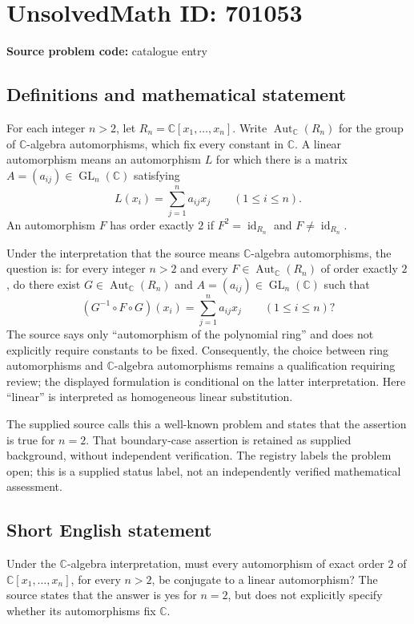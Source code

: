 \documentclass[11pt]{article}
\newcommand{\C}{\mathbb{C}}
\begin{document}
\section*{UnsolvedMath ID: 701053}
\textbf{Source problem code:} catalogue entry
\subsection{Definitions and mathematical statement}
For each integer \(n>2\), let \(R_n=\C[x_1,\ldots,x_n]\). Write \(\operatorname{Aut}_{\C}(R_n)\) for the group of \(\C\)-algebra automorphisms, which fix every constant in \(\C\). A linear automorphism means an automorphism \(L\) for which there is a matrix \(A=(a_{ij})\in\operatorname{GL}_n(\C)\) satisfying
\[
L(x_i)=\sum_{j=1}^{n}a_{ij}x_j\qquad(1\leq i\leq n).
\]
An automorphism \(F\) has order exactly \(2\) if \(F^2=\operatorname{id}_{R_n}\) and \(F\neq\operatorname{id}_{R_n}\).

Under the interpretation that the source means \(\C\)-algebra automorphisms, the question is: for every integer \(n>2\) and every \(F\in\operatorname{Aut}_{\C}(R_n)\) of order exactly \(2\), do there exist \(G\in\operatorname{Aut}_{\C}(R_n)\) and \(A=(a_{ij})\in\operatorname{GL}_n(\C)\) such that
\[
(G^{-1}\circ F\circ G)(x_i)=\sum_{j=1}^{n}a_{ij}x_j\qquad(1\leq i\leq n)?
\]
The source says only ``automorphism of the polynomial ring'' and does not explicitly require constants to be fixed. Consequently, the choice between ring automorphisms and \(\C\)-algebra automorphisms remains a qualification requiring review; the displayed formulation is conditional on the latter interpretation. Here ``linear'' is interpreted as homogeneous linear substitution.

The supplied source calls this a well-known problem and states that the assertion is true for \(n=2\). That boundary-case assertion is retained as supplied background, without independent verification. The registry labels the problem open; this is a supplied status label, not an independently verified mathematical assessment.
\subsection{Short English statement}
Under the \(\C\)-algebra interpretation, must every automorphism of exact order \(2\) of \(\C[x_1,\ldots,x_n]\), for every \(n>2\), be conjugate to a linear automorphism? The source states that the answer is yes for \(n=2\), but does not explicitly specify whether its automorphisms fix \(\C\).
\end{document}
